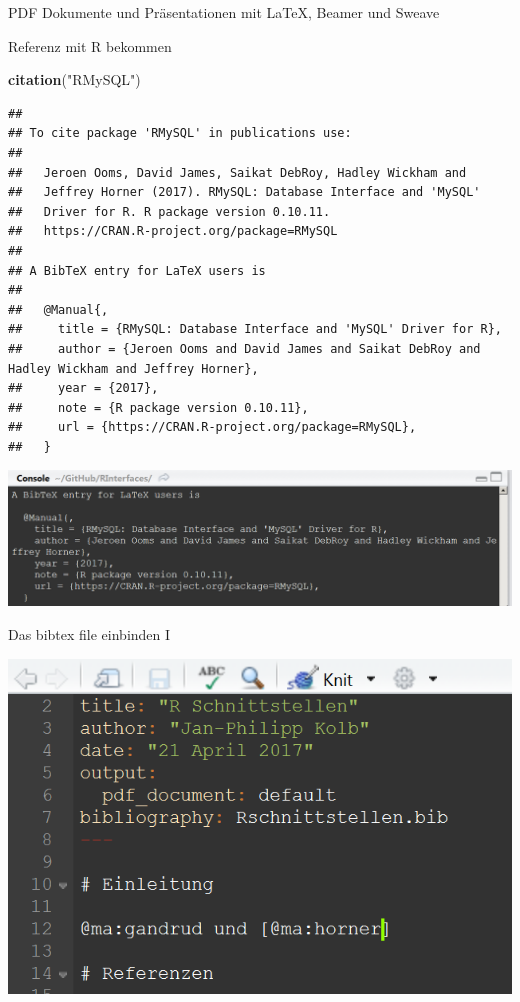 \documentclass[ignorenonframetext,]{beamer}
\newenvironment{Shaded}{}{}
\newcommand{\KeywordTok}[1]{\textcolor[rgb]{0.00,0.44,0.13}{\textbf{{#1}}}}
\newcommand{\StringTok}[1]{\textcolor[rgb]{0.25,0.44,0.63}{{#1}}}
\newcommand{\NormalTok}[1]{{#1}}
\begin{document}
\begin{frame}[fragile]{PDF Dokumente und Präsentationen mit LaTeX,
Beamer und Sweave}
\begin{block}{Referenz mit R bekommen}
\begin{Shaded}
\begin{Highlighting}[]
\KeywordTok{citation}\NormalTok{(}\StringTok{"RMySQL"}\NormalTok{)}
\end{Highlighting}
\end{Shaded}

\begin{verbatim}
## 
## To cite package 'RMySQL' in publications use:
## 
##   Jeroen Ooms, David James, Saikat DebRoy, Hadley Wickham and
##   Jeffrey Horner (2017). RMySQL: Database Interface and 'MySQL'
##   Driver for R. R package version 0.10.11.
##   https://CRAN.R-project.org/package=RMySQL
## 
## A BibTeX entry for LaTeX users is
## 
##   @Manual{,
##     title = {RMySQL: Database Interface and 'MySQL' Driver for R},
##     author = {Jeroen Ooms and David James and Saikat DebRoy and Hadley Wickham and Jeffrey Horner},
##     year = {2017},
##     note = {R package version 0.10.11},
##     url = {https://CRAN.R-project.org/package=RMySQL},
##   }
\end{verbatim}

\includegraphics{./tex2pdf.9796/a3e1b0c65e3f5ed3460c3943bc46cd1a70379380.png}

\end{block}

\begin{block}{Das bibtex file einbinden I}

\includegraphics{./tex2pdf.9796/86d2f3bc47d399904fe1f3925e4d98e3e254ccde.png}


\end{block}
\end{frame}
\end{document}
